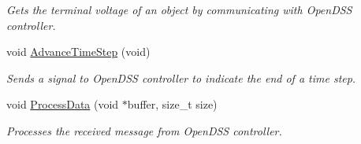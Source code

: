 \begin{DoxyCompactItemize}
\begin{DoxyCompactList}\small\item\em Gets the terminal voltage of an object by communicating with Open\-D\-S\-S controller. \end{DoxyCompactList}\item 
void \hyperlink{class_matlab_manager_a55151e4e7f68cad7a8b18c93e9f0e0b1}{Advance\-Time\-Step} (void)
\begin{DoxyCompactList}\small\item\em Sends a signal to Open\-D\-S\-S controller to indicate the end of a time step. \end{DoxyCompactList}\item 
void \hyperlink{class_matlab_manager_a7219113b7bc0744fe8faa94d599fe826}{Process\-Data} (void $\ast$buffer, size\-\_\-t size)
\begin{DoxyCompactList}\small\item\em Processes the received message from Open\-D\-S\-S controller. \end{DoxyCompactList}\end{DoxyCompactItemize}
